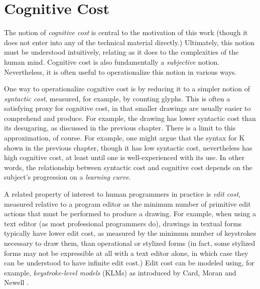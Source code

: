 
\section{Cognitive Cost}\label{sec:syntactic-properties}
The notion of \emph{cognitive cost} is central to the motivation of this work (though it does not enter into any of the technical material directly.) Ultimately, this notion must be understood intuitively, relating as it does to the complexities of the human mind. Cognitive cost is also fundamentally a \emph{subjective} notion. Nevertheless, it is often useful to operationalize this notion in various ways. 

One way to operationalize cognitive cost is by reducing it to a simpler notion of \emph{syntactic cost}, measured, for example, by counting glyphs. This is often a satisfying proxy for cognitive cost, in that smaller drawings are usually easier to comprehend and produce. For example, the drawing \li{[1, 2, 3, 4, 5]} has lower syntactic cost than its desugaring, as discussed in the previous chapter. There is a limit to this approximation, of course. For example, one might argue that the syntax for K shown in the previous chapter, though it has low syntactic cost, nevertheless has high cognitive cost, at least until one is well-experienced with its use. In other words, the relationship between syntactic cost and cognitive cost depends on the subject's progression on a \emph{learning curve}.

A related property of interest to human programmers in practice is \emph{edit cost}, measured relative to a program editor as the minimum number of primitive edit actions that must be performed to produce a drawing. For example, when using a text editor (as most professional programmers do), drawings in textual forms typically have lower edit cost, as measured by the minimum number of keystrokes necessary to draw them, than operational or stylized forms (in fact, some stylized forms may not be expressible at all with a text editor alone, in which case they can be understood to have infinite edit cost.) Edit cost can be modeled using, for example, \emph{keystroke-level models} (KLMs) as introduced by Card, Moran and Newell \cite{journals/cacm/CardMN80}.%

